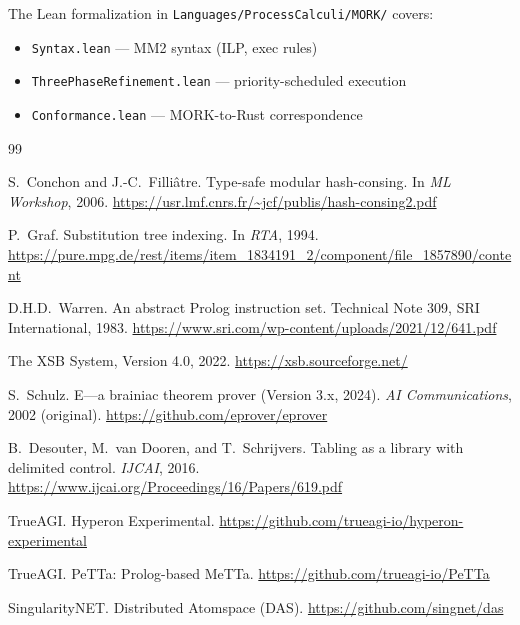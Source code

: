 \documentclass[11pt]{article}
\newcommand{\code}[1]{\texttt{#1}}
\newcommand{\MORK}{\textup{MORK}}
\begin{document}
The Lean formalization in \code{Languages/ProcessCalculi/MORK/} covers:
\begin{itemize}[nosep]
  \item \code{Syntax.lean} --- MM2 syntax (ILP, exec rules)
  \item \code{ThreePhaseRefinement.lean} --- priority-scheduled execution
  \item \code{Conformance.lean} --- \MORK{}-to-Rust correspondence
\end{itemize}


\begin{thebibliography}{99}

S.~Conchon and J.-C.~Filliâtre.
\newblock Type-safe modular hash-consing.
\newblock In \emph{ML Workshop}, 2006.
\newblock \url{https://usr.lmf.cnrs.fr/~jcf/publis/hash-consing2.pdf}

P.~Graf.
\newblock Substitution tree indexing.
\newblock In \emph{RTA}, 1994.
\newblock \url{https://pure.mpg.de/rest/items/item_1834191_2/component/file_1857890/content}

D.H.D.~Warren.
\newblock An abstract Prolog instruction set.
\newblock Technical Note 309, SRI International, 1983.
\newblock \url{https://www.sri.com/wp-content/uploads/2021/12/641.pdf}

The XSB System, Version 4.0, 2022.
\newblock \url{https://xsb.sourceforge.net/}

S.~Schulz.
\newblock E---a brainiac theorem prover (Version 3.x, 2024).
\newblock \emph{AI Communications}, 2002 (original).
\newblock \url{https://github.com/eprover/eprover}

B.~Desouter, M.~van Dooren, and T.~Schrijvers.
\newblock Tabling as a library with delimited control.
\newblock \emph{IJCAI}, 2016.
\newblock \url{https://www.ijcai.org/Proceedings/16/Papers/619.pdf}

TrueAGI.
\newblock Hyperon Experimental.
\newblock \url{https://github.com/trueagi-io/hyperon-experimental}

TrueAGI.
\newblock PeTTa: Prolog-based MeTTa.
\newblock \url{https://github.com/trueagi-io/PeTTa}

SingularityNET.
\newblock Distributed Atomspace (DAS).
\newblock \url{https://github.com/singnet/das}


\end{thebibliography}
\end{document}
